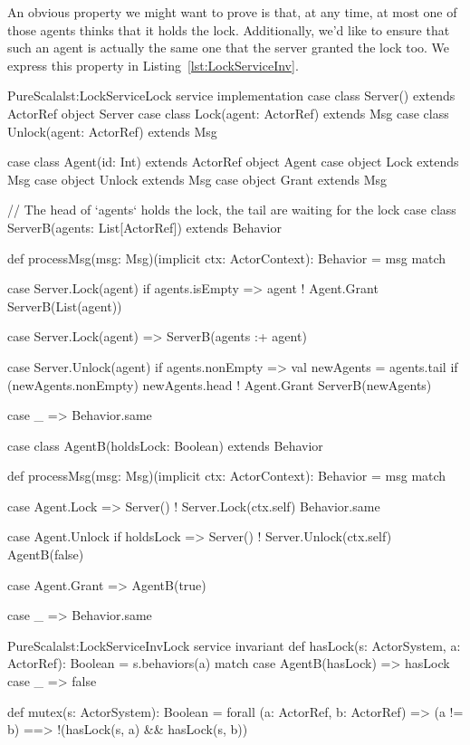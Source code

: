 \documentclass[a4paper,twoside]{article}
\newcommand{\RefCode}[1]{Listing~\ref{#1}}
\begin{document}
\begin{enumerate}
An obvious property we might want to prove is that, at any time, at most one of those agents thinks that it holds the lock. Additionally, we'd like to ensure that such an agent is actually the same one that the server granted the lock too. We express this property in \RefCode{lst:LockServiceInv}.

\begin{Code}{PureScala}{lst:LockService}{Lock service implementation}
case class Server() extends ActorRef
object Server {
  case class Lock(agent: ActorRef) extends Msg
  case class Unlock(agent: ActorRef) extends Msg
}

case class Agent(id: Int) extends ActorRef
object Agent {
  case object Lock   extends Msg
  case object Unlock extends Msg
  case object Grant  extends Msg
}

// The head of `agents` holds the lock, the tail are waiting for the lock
case class ServerB(agents: List[ActorRef]) extends Behavior {
  def processMsg(msg: Msg)(implicit ctx: ActorContext): Behavior = msg match {
    case Server.Lock(agent) if agents.isEmpty =>
      agent ! Agent.Grant
      ServerB(List(agent))

    case Server.Lock(agent) =>
      ServerB(agents :+ agent)

    case Server.Unlock(agent) if agents.nonEmpty =>
      val newAgents = agents.tail
      if (newAgents.nonEmpty) newAgents.head ! Agent.Grant
      ServerB(newAgents)

    case _ =>
      Behavior.same
  }
}

case class AgentB(holdsLock: Boolean) extends Behavior {
  def processMsg(msg: Msg)(implicit ctx: ActorContext): Behavior = msg match {
    case Agent.Lock =>
      Server() ! Server.Lock(ctx.self)
      Behavior.same

    case Agent.Unlock if holdsLock =>
      Server() ! Server.Unlock(ctx.self)
      AgentB(false)

    case Agent.Grant =>
      AgentB(true)

    case _ =>
      Behavior.same
  }
}
\end{Code}

\begin{Code}{PureScala}{lst:LockServiceInv}{Lock service invariant}
def hasLock(s: ActorSystem, a: ActorRef): Boolean = {
  s.behaviors(a) match {
    case AgentB(hasLock) => hasLock
    case _ => false
  }
}

def mutex(s: ActorSystem): Boolean = forall { (a: ActorRef, b: ActorRef) =>
  (a != b) ==> !(hasLock(s, a) && hasLock(s, b))
}


\end{Code}
\end{enumerate}
\end{document}
